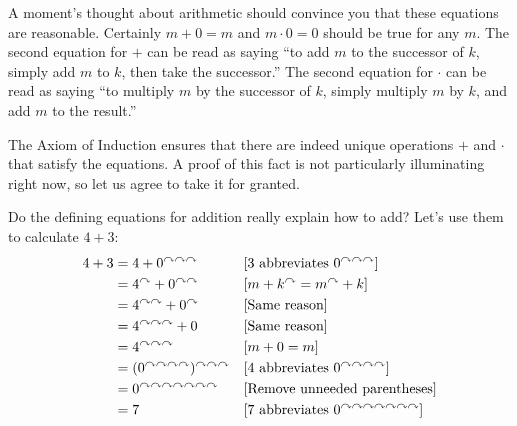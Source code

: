 A moment's thought about arithmetic should convince you that these equations are reasonable.
Certainly $m+0=m$ and $m\cdot 0 = 0$ should be true for any $m$. 
The second equation for $+$ can be read as saying ``to add $m$ to the successor of $k$, simply add $m$ to $k$, then take the successor.''
The second equation for $\cdot$ can be read as saying ``to multiply $m$ by the successor of $k$, simply multiply $m$ by $k$, and add $m$ to the result.''

The Axiom of Induction ensures that there are indeed unique operations $+$ and $\cdot$ that satisfy the equations.
A proof of this fact is not particularly illuminating right now, so let us agree to take it for granted.

\begin{example}
Do the defining equations for addition really explain how to add? Let's use them to calculate
$4+3$:
\begin{align*}
  4 + 3 &= 4 + 0^{\curvearrowright\curvearrowright\curvearrowright}&&\text{[$3$ abbreviates $0^{\curvearrowright\curvearrowright\curvearrowright}$]}\\
  &= 4^\curvearrowright + 0^{\curvearrowright\curvearrowright} &&\text{[$m + k^\curvearrowright = m^\curvearrowright+k$]}\\
  &= 4^{\curvearrowright\curvearrowright} + 0^\curvearrowright &&\text{[Same reason]}\\
  &= 4^{\curvearrowright\curvearrowright\curvearrowright} + 0 &&\text{[Same reason]}\\
  &= 4^{\curvearrowright\curvearrowright\curvearrowright} &&\text{[$m+0 = m$]}\\
  &= (0^{\curvearrowright\curvearrowright\curvearrowright\curvearrowright})^{\curvearrowright\curvearrowright\curvearrowright} && \text{[$4$ abbreviates $0^{\curvearrowright\curvearrowright\curvearrowright\curvearrowright}$]}\\
  &= 0^{\curvearrowright\curvearrowright\curvearrowright\curvearrowright\curvearrowright\curvearrowright\curvearrowright} && \text{[Remove unneeded parentheses]}\\
  &= 7 &&\text{[$7$ abbreviates $0^{\curvearrowright\curvearrowright\curvearrowright\curvearrowright\curvearrowright\curvearrowright\curvearrowright}$]}
\end{align*}
\end{example}
\ipadbreak

